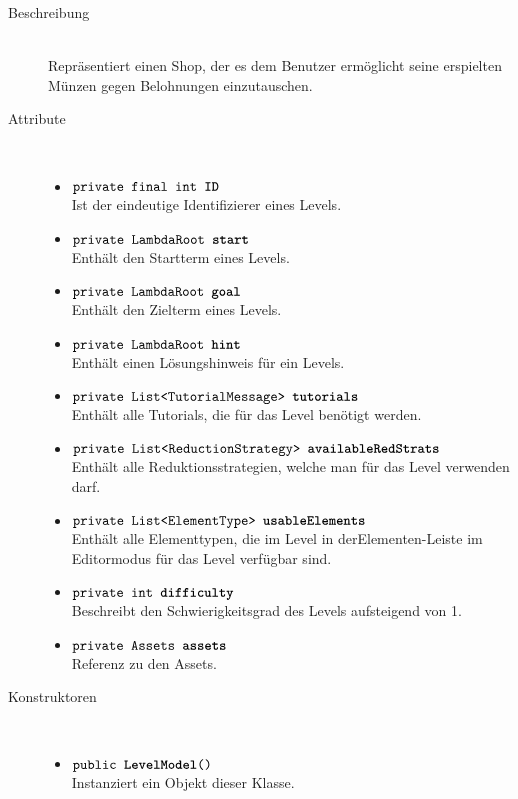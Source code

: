 \begin{description}
\item[Beschreibung] \hfill \\ Repräsentiert einen Shop, der es dem Benutzer ermöglicht seine erspielten Münzen gegen Belohnungen einzutauschen.

\item[Attribute] \hfill \\
	\vspace{-.8cm}
	\begin{itemize}
		\item $\texttt{private final int \textbf{ID}}$ \\ Ist der eindeutige Identifizierer eines Levels.
		\item $\texttt{private LambdaRoot \textbf{start}}$ \\ Enthält den Startterm eines Levels.
		\item $\texttt{private LambdaRoot \textbf{goal}}$ \\ Enthält den Zielterm eines Levels.
		\item $\texttt{private LambdaRoot \textbf{hint}}$ \\ Enthält einen Lösungshinweis für ein Levels.
		\item $\texttt{private List<TutorialMessage> \textbf{tutorials}}$ \\ Enthält alle Tutorials, die für das Level benötigt werden.
		\item $\texttt{private List<ReductionStrategy> \textbf{availableRedStrats}}$ \\ Enthält alle Reduktionsstrategien, welche man für das Level verwenden darf.
		\item $\texttt{private List<ElementType> \textbf{usableElements}}$ \\ Enthält alle Elementtypen, die im Level in derElementen-Leiste im Editormodus für das Level verfügbar sind.
		\item $\texttt{private int \textbf{difficulty}}$ \\ Beschreibt den Schwierigkeitsgrad des Levels aufsteigend von 1.
		\item $\texttt{private Assets \textbf{assets}}$ \\ Referenz zu den Assets.
		\end{itemize}
	
\item[Konstruktoren] \hfill \\
	\vspace{-.8cm}
	\begin{itemize}
		\item $\texttt{public \textbf{LevelModel}()}$ \\ Instanziert ein Objekt dieser Klasse.


\end{itemize}
\end{description}
